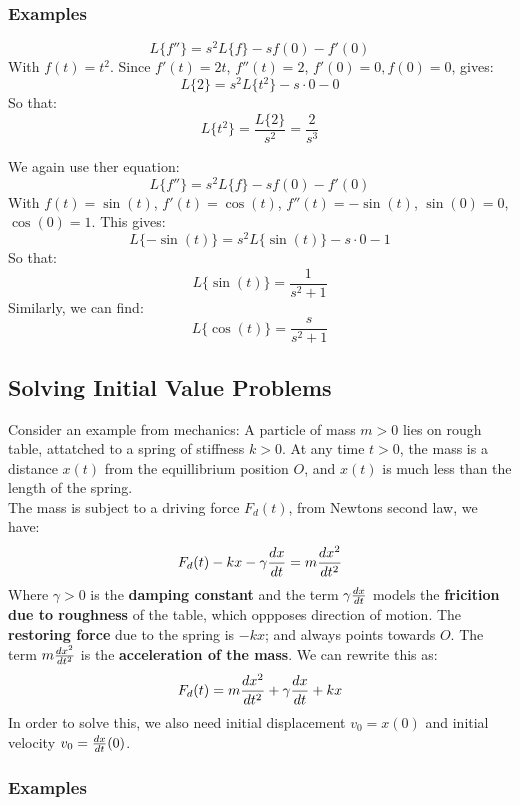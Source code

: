 \documentclass[a4paper, 10pt]{article}
\begin{document}
\subsubsection{Examples}

\begin{examplebox}[Find $L\{t^2\}$ using the fact $L\{s\} = 1/s$ for $s > 0$]
  $$L\{f''\} = s^2 L\{f\} - sf(0) - f'(0)$$
  With $f(t) = t^2$.
  Since $f'(t) = 2t$, $f''(t) = 2$, $f'(0) = 0, f(0) = 0$, gives:
  $$L\{2\} = s^2 L\{t^2\} - s \cdot 0 - 0$$
  So that:
  $$L\{t^2\} = \frac{L\{2\}}{s^2} = \frac{2}{s^3}$$
\end{examplebox}

\begin{examplebox}
  We again use ther equation:
  $$L\{f''\} = s^2 L\{f\} - sf(0) - f'(0)$$
  With $f(t) = \sin(t)$, $f'(t) = \cos(t)$, $f''(t) = -\sin(t)$, $\sin(0) = 0$, $\cos(0) = 1$. This gives:
  $$L\{-\sin(t)\} = s^2 L\{\sin(t)\} - s \cdot 0 - 1$$
  So that:
  $$L\{\sin(t)\} = \frac{1}{s^2 + 1}$$
  Similarly, we can find:
  $$L\{\cos(t)\} = \frac{s}{s^2 + 1}$$
\end{examplebox}
\pagebreak

\subsection{Solving Initial Value Problems}
Consider an example from mechanics: A particle of mass $m > 0$ lies on rough table, attatched to a spring of stiffness $k > 0$. At any time $t > 0$, the mass is a distance $x(t)$ from the equillibrium position $O$, and $x(t)$ is much less than the length of the spring. \\
The mass is subject to a driving force $F_d(t)$, from Newtons second law, we have:
$$F_d(t) - kx - \gamma \frac{dx}{dt} = m \frac{dx^2}{dt^2}$$
Where $\gamma > 0$ is the \textbf{damping constant} and the term $\gamma \frac{dx}{dt}$ models the \textbf{fricition due to roughness} of the table, which oppposes direction of motion. The \textbf{restoring force} due to the spring is $-kx$; and always points towards $O$. The term $m \frac{dx^2}{dt^2}$ is the \textbf{acceleration of the mass}. We can rewrite this as:
$$F_d(t) = m \frac{dx^2}{dt^2} + \gamma \frac{dx}{dt} + kx$$
In order to solve this, we also need initial displacement $v_0 = x(0)$ and initial velocity $v_0 = \frac{dx}{dt}(0)$.

\subsubsection{Examples}
\end{document}
